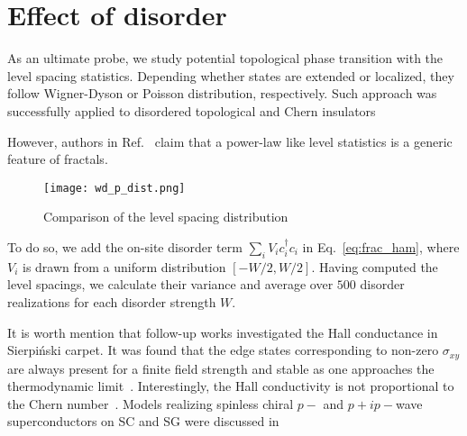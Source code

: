 \section{Effect of disorder}

As an ultimate probe, we study potential topological phase transition with the level spacing statistics. Depending whether states are extended or localized, they follow Wigner-Dyson or Poisson distribution, respectively. Such approach was successfully applied to disordered topological and Chern insulators~\cite{2010:ProdanDisordCI, 2011:Prodan}


However, authors in Ref.~\cite{KatnelsonLevels2019} claim that a power-law like level statistics is a generic feature of fractals.

\begin{figure}
\centering
\texttt{[image: wd\_p\_dist.png]} 
\caption{Comparison of the level spacing distribution}
\label{fig:ls_distr}
\end{figure}


To do so, we add the on-site disorder term $\sum_i V_i c_i^{\dagger} c_i$ in Eq.~\eqref{eq:frac_ham}, where $V_i$ is drawn from a uniform distribution $[-W/2, W/2 ]$. Having computed the level spacings, we calculate their variance and average over $500$ disorder realizations for each disorder strength $W$.



It is worth mention that follow-up works investigated the Hall conductance in Sierpiński carpet. It was found that the edge states corresponding to non-zero $\sigma_{xy}$ are always present for a finite field strength and stable as one approaches the thermodynamic limit~\cite{EdgesFremling2020}. Interestingly, the Hall conductivity is not proportional to the Chern number~. Models realizing spinless chiral $p-$ and $p +ip-$wave superconductors on SC and SG were discussed in~\cite{PaiFractal2019}


